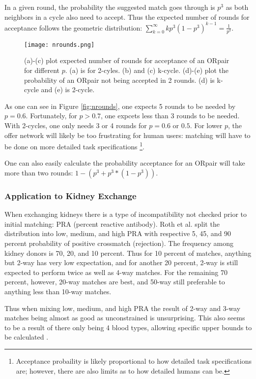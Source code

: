\documentclass[main.tex]{subfiles}
\begin{document}
In a given round, the probability the suggested match goes through is $p^3$ as both neighbors in a cycle also need to accept. Thus the expected number of rounds for acceptance follows the geometric distribution: $\sum_{k=0}^{\infty} k p^3 (1 - p^3)^{k-1} = \frac{1}{p^3}$.

\begin{figure}
  \texttt{[image: nrounds.png]}
  \caption{(a)-(c) plot expected number of rounds for acceptance of an ORpair for different $p$. (a) is for 2-cyles. (b) and (c) k-cycle. (d)-(e) plot the probability of an ORpair not being accepted in 2 rounds. (d) is k-cycle and (e) is 2-cycle.}
  \label{nrounds}
\end{figure}

As one can see in Figure \ref{fig:nrounds}, one expects 5 rounds to be needed by $p = 0.6$. Fortunately, for $p > 0.7$, one expcets less than 3 rounds to be needed. With 2-cycles, one only needs 3 or 4 rounds for $p = 0.6$ or $0.5$. For lower $p$, the offer network will likely be too frustrating for human users: matching will have to be done on more detailed task specifications \footnote{Acceptance probaility is likely proportional to how detailed task specifications are; however, there are also limits as to how detailed humans can be.}.

One can also easily calculate the probability acceptance for an ORpair will take more than two rounds: $1 - (p^3 + p^3 * (1 - p^3))$.

\subsubsection{Application to Kidney Exchange}
When exchanging kidneys there is a type of incompatibility not checked prior to initial matching: PRA (percent reactive antibody). Roth et al. \cite{Rot2} split the distribution into low, medium, and high PRA with respective 5, 45, and 90 percent probability of positive crossmatch (rejection). The frequency among kidney donors is 70, 20, and 10 percent. Thus for 10 percent of matches, anything but 2-way has very low expectation, and for another 20 percent, 2-way is still expected to perform twice as well as 4-way matches. For the remaining 70 percent, however, 20-way matches are best, and 50-way still preferable to anything less than 10-way matches.

Thus when mixing low, medium, and high PRA the result of 2-way and 3-way matches being almost as good as unconstrained is unsurprising. This also seems to be a result of there only being 4 blood types, allowing specific upper bounds to be calculated \cite{Rot2}.
\end{document}
